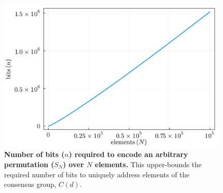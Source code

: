 \begin{figure}[!htb]
	\includegraphics[width=\columnwidth]{figs/bits_permutations.pdf}
	\caption{\textbf{Number of bits ($n$) required to encode an arbitrary permutation ($S_N$) over $N$ elements.} This upper-bounds the required number of bits to uniquely address elements of the consensus group, $C(d)$.} \label{fig:bits_permutations}
\end{figure}